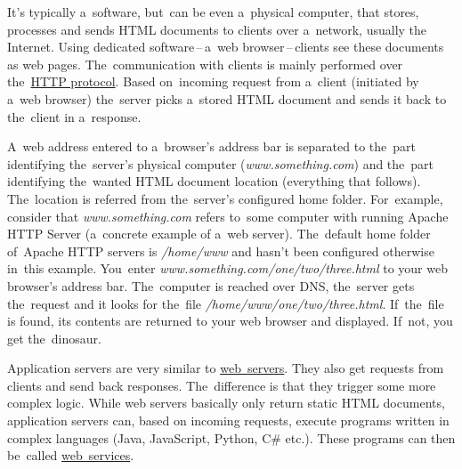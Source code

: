 \label{namespaces}

\label{webserver}
It's typically a~software, but~can be even a~physical computer, that stores, processes and sends HTML documents to clients over a~network, usually the Internet. Using dedicated software\,--\,a~web browser\,--\,clients see these documents as web pages. The~communication with clients is mainly performed over the~\hyperref[http]{HTTP protocol}. Based on~incoming request from a~client (initiated by a~web browser) the~server picks a~stored HTML document and sends it back to the~client in a~response.

A~web address entered to a~browser's address bar is separated to the~part identifying the~server's physical computer (\textit{www.something.com}) and the~part identifying the~wanted HTML document location (everything that follows). The~location is referred from the~server's configured home folder. For~example, consider that \textit{www.something.com} refers to~some computer with running Apache HTTP Server (a~concrete example of a~web server). The~default home folder of~Apache HTTP servers is \textit{/home/www} and hasn't been configured otherwise in~this example. You~enter \textit{www.something.com/one/two/three.html} to your web browser's address bar. The~computer is reached over DNS, the~server gets the~request and it looks for the~file \textit{/home/www/one/two/three.html}. If~the~file is found, its contents are returned to your web browser and displayed. If~not, you get the~dinosaur.

\label{applicationserver}
Application servers are very similar to \hyperref[webserver]{web~servers}. They also get requests from clients and send back responses. The~difference is that they trigger some more complex logic. While web servers basically only return static HTML documents, application servers can, based on incoming requests, execute programs written in complex languages (Java, JavaScript, Python, C\# etc.). These programs can then be~called \hyperref[webservice]{web~services}.